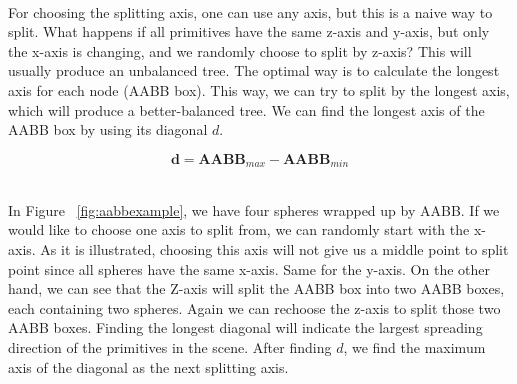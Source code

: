 \documentclass[11pt,a4paper]{article}
\begin{document}
\noindent
\\
For choosing the splitting axis, one can use any axis, but this is a naive way to split. What happens if all primitives have the same z-axis and y-axis, but only the x-axis is changing, and we randomly choose to split by z-axis? This will usually produce an unbalanced tree. The optimal way is to calculate the longest axis for each node (AABB box). This way, we can try to split by the longest axis, which will produce a better-balanced tree. We can find the longest axis of the AABB box by using its diagonal $d$. 


\begin{equation}
\textbf{d} = \textbf{AABB}_{max} - \textbf{AABB}_{min}
\end{equation}

\noindent
\\
In Figure ~\ref{fig:aabbexample}, we have four spheres wrapped up by AABB. If we would like to choose one axis to split from, we can randomly start with the x-axis. As it is illustrated, choosing this axis will not give us a middle point to split point since all spheres have the same x-axis. Same for the y-axis. On the other hand, we can see that the Z-axis will split the AABB box into two AABB boxes, each containing two spheres. Again we can rechoose the z-axis to split those two AABB boxes. Finding the longest diagonal will indicate the largest spreading direction of the primitives in the scene. After finding $d$, we find the maximum axis of the diagonal as the next splitting axis.
\end{document}
